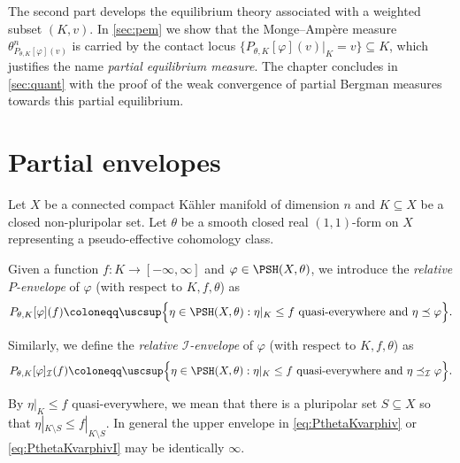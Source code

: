 The second part develops the equilibrium theory associated with a weighted subset $(K,v)$. In \cref{sec:pem} we show that the Monge--Amp\`ere measure $\theta_{P_{\theta,K}[\varphi](v)}^n$ is carried by the contact locus $\{P_{\theta,K}[\varphi](v)|_K=v\}\subseteq K$, which justifies the name \emph{partial equilibrium measure}. The chapter concludes in \cref{sec:quant} with the proof of the weak convergence of partial Bergman measures towards this partial equilibrium.

\section{Partial envelopes}\label{sec:envrel}
Let $X$ be a connected compact Kähler manifold of dimension $n$ and $K \subseteq X$ be a closed non-pluripolar set.
Let $\theta$ be a smooth closed real $(1,1)$-form on $X$ representing a pseudo-effective cohomology class.

\begin{definition}\label{def:partial_env}
    Given a function $f\colon K\rightarrow [-\infty,\infty]$ and $\varphi\in \PSH(X,\theta)$, we introduce the \emph{relative $P$-envelope} of $\varphi$ (with respect to $K,f,\theta$) as
    \begin{equation}\label{eq:PthetaKvarphiv}
    P_{\theta,K}[\varphi](f)\coloneqq  \uscsup \Bigl\{ \eta \in \PSH(X,\theta): \eta|_K \leq f  \textup{ quasi-everywhere and } \eta\preceq \varphi\Bigr\}.
    \end{equation}

    Similarly, we define the \emph{relative $\mathcal{I}$-envelope} of $\varphi$ (with respect to $K,f,\theta$) as
    \begin{equation}\label{eq:PthetaKvarphivI}
    P_{\theta,K}[\varphi]_{\mathcal{I}}(f)\coloneqq  \uscsup \Bigl\{ \eta \in \PSH(X,\theta): \eta|_K \leq f  \textup{ quasi-everywhere and } \eta\preceq_{\mathcal{I}} \varphi\Bigr\}.
    \end{equation}
\end{definition}
By $\eta|_K\leq f$ quasi-everywhere, we mean that there is a pluripolar set $S\subseteq X$ so that $\eta|_{K\setminus S}\leq f|_{K\setminus S}$. In general the upper envelope in \eqref{eq:PthetaKvarphiv} or \eqref{eq:PthetaKvarphivI} may be identically $\infty$.

